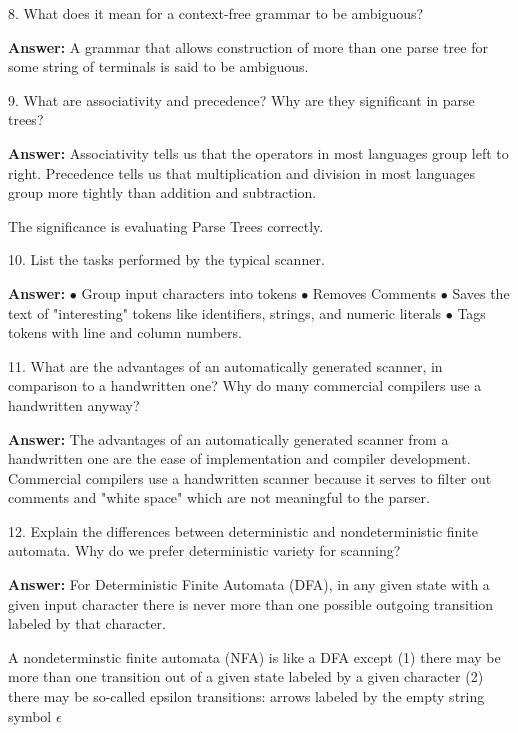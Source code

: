 \filbreak
\vskip 1cm

8. What does it mean for a context-free grammar to be ambiguous?

\vskip 3mm
{\bf Answer:} A grammar that allows construction of more than one parse tree for some string of terminals is said to be ambiguous.

\filbreak
\vskip 1cm

9. What are associativity and precedence? Why are they significant in parse trees?

\vskip 3mm
{\bf Answer:} Associativity tells us that the operators in most languages group left to right. Precedence tells us that multiplication and division in most languages group more tightly than addition and subtraction.

\vskip 2mm
The significance is evaluating Parse Trees correctly.

\filbreak
\vskip 1cm

10. List the tasks performed by the typical scanner.

\vskip 3mm
{\bf Answer:}
\vskip 1mm
\qquad$\bullet$ Group input characters into tokens
\vskip 1mm
\qquad$\bullet$ Removes Comments
\vskip 1mm
\qquad$\bullet$ Saves the text of "interesting" tokens like identifiers, strings, and numeric literals
\vskip 1mm
\qquad$\bullet$ Tags tokens with line and column numbers.

\filbreak
\vskip 1cm

11. What are the advantages of an automatically generated scanner, in comparison to a handwritten one? Why do many commercial compilers use a handwritten anyway?

\vskip 3mm
{\bf Answer:} The advantages of an automatically generated scanner from a handwritten one are the ease of implementation and compiler development. Commercial compilers use a handwritten scanner because it serves to filter out comments and "white space" which are not meaningful to the parser.

\filbreak
\vskip 1cm

12. Explain the differences between deterministic and nondeterministic finite automata. Why do we prefer deterministic variety for scanning?

\vskip 3mm
{\bf Answer:} For Deterministic Finite Automata (DFA), in any given state with a given input character there is never more than one possible outgoing transition labeled by that character.

\vskip 2mm
A nondeterminstic finite automata (NFA) is like a DFA except
\vskip 1mm
(1) there may be more than one transition out of a given state labeled by a given character
\vskip 2mm
(2) there may be so-called epsilon transitions: arrows labeled by the empty string symbol $\epsilon$

